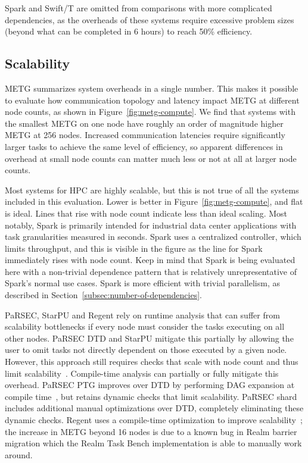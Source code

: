 Spark and Swift/T
are omitted from comparisons with more complicated dependencies, as the overheads of these systems require
excessive problem sizes (beyond what can be completed in 6
hours) to reach 50\% efficiency.

\subsection{Scalability}
\label{subsec:scalability}

METG summarizes system overheads in a single number. This makes it possible to
evaluate how communication topology and latency impact METG at
different node counts, as shown in Figure~\ref{fig:metg-compute}.
We find that
systems with the smallest METG on one node have roughly an order
of magnitude higher METG at 256 nodes. Increased communication latencies require significantly larger tasks to
achieve the same level of efficiency, so apparent differences in
overhead at small node counts can matter much less or not at
all at larger node counts.

Most systems for HPC are highly scalable,
but this is not true of all the systems included in this
evaluation. Lower is better in Figure~\ref{fig:metg-compute}, and
flat is ideal. Lines that rise with node count indicate less than
ideal scaling. Most notably, Spark is primarily
intended for industrial data center applications with task
granularities measured in seconds. Spark uses a centralized
controller, which limits throughput, and this is visible in the figure
as the line for Spark immediately rises with node count. Keep in mind
that Spark is being evaluated here with a non-trivial dependence
pattern that is relatively unrepresentative of Spark's normal use
cases. Spark is more efficient with trivial parallelism, as described
in Section~\ref{subsec:number-of-dependencies}.



PaRSEC, StarPU and Regent
rely on runtime analysis that can suffer from
scalability bottlenecks if every node must consider the tasks
executing on all other nodes. PaRSEC DTD and StarPU mitigate this
partially by allowing the user to omit tasks not directly
dependent on those executed by a given node. However, this approach still requires checks that scale with
node count and thus limit scalability~\cite{PARSEC_DTD}. Compile-time analysis can
partially or fully mitigate this overhead. PaRSEC PTG improves over DTD 
by performing DAG expansion at compile time~\cite{PARSEC_DTD}, but
retains dynamic checks that limit scalability. PaRSEC shard includes additional manual optimizations over DTD, completely eliminating these dynamic checks. Regent
uses a compile-time optimization to improve
scalability~\cite{ControlReplication17}; the increase in METG beyond 16 nodes is due to a known bug in Realm barrier migration which the Realm Task Bench implementation is able to manually work around.

